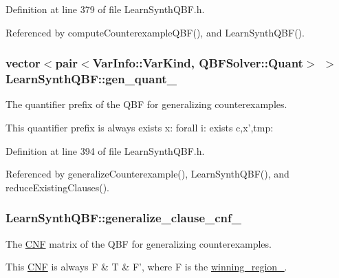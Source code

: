 Definition at line 379 of file Learn\-Synth\-Q\-B\-F.\-h.



Referenced by compute\-Counterexample\-Q\-B\-F(), and Learn\-Synth\-Q\-B\-F().

\hypertarget{classLearnSynthQBF_a2a6687cca6f45b9684d3bd6e7cc8c20c}{
\subsubsection[{gen\-\_\-quant\-\_\-}]{\setlength{\rightskip}{0pt plus 5cm}vector$<$pair$<${\bf Var\-Info\-::\-Var\-Kind}, {\bf Q\-B\-F\-Solver\-::\-Quant}$>$ $>$ Learn\-Synth\-Q\-B\-F\-::gen\-\_\-quant\-\_\-\hspace{0.3cm}{\ttfamily [protected]}}}\label{classLearnSynthQBF_a2a6687cca6f45b9684d3bd6e7cc8c20c}


The quantifier prefix of the Q\-B\-F for generalizing counterexamples. 

This quantifier prefix is always exists x\-: forall i\-: exists c,x',tmp\-: 

Definition at line 394 of file Learn\-Synth\-Q\-B\-F.\-h.



Referenced by generalize\-Counterexample(), Learn\-Synth\-Q\-B\-F(), and reduce\-Existing\-Clauses().

\hypertarget{classLearnSynthQBF_adb0678a7c034958c31bd5d92615e9859}{
\subsubsection[{generalize\-\_\-clause\-\_\-cnf\-\_\-}]{ Learn\-Synth\-Q\-B\-F\-::generalize\-\_\-clause\-\_\-cnf\-\_\-\hspace{0.3cm}{\ttfamily [protected]}}}\label{classLearnSynthQBF_adb0678a7c034958c31bd5d92615e9859}


The \hyperlink{classCNF}{C\-N\-F} matrix of the Q\-B\-F for generalizing counterexamples. 

This \hyperlink{classCNF}{C\-N\-F} is always F \& T \& F', where F is the \hyperlink{classLearnSynthQBF_a9c6b41f7df5f4ed4bfc5930136fc1152}{winning\-\_\-region\-\_\-}. 

